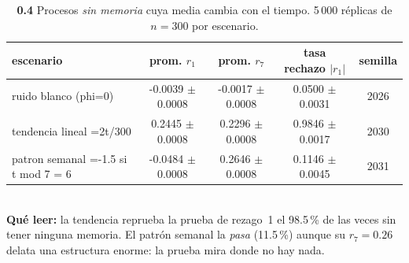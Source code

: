 \begin{table}[htbp]
\centering
\footnotesize
\caption{\textbf{0.4} Procesos \emph{sin memoria} cuya media cambia con el tiempo. 5\,000 r\'eplicas de $n=300$ por escenario.}
\label{tab:p0_tabla_media_no_constante}
\begin{tabular}{lcccc}
\toprule
\textbf{escenario} & \textbf{prom. $r_1$} & \textbf{prom. $r_7$} & \textbf{tasa rechazo $|r_1|$} & \textbf{semilla} \\
\midrule
ruido blanco (phi=0) & -0.0039 \tiny$\pm$0.0008 & -0.0017 \tiny$\pm$0.0008 & 0.0500 \tiny$\pm$0.0031 & 2026 \\
tendencia lineal =2t/300 & 0.2445 \tiny$\pm$0.0008 & 0.2296 \tiny$\pm$0.0008 & 0.9846 \tiny$\pm$0.0017 & 2030 \\
patron semanal =-1.5 si t mod 7 = 6 & -0.0484 \tiny$\pm$0.0008 & 0.2646 \tiny$\pm$0.0008 & 0.1146 \tiny$\pm$0.0045 & 2031 \\
\bottomrule
\end{tabular}
\\[0.3em]{\scriptsize \textbf{Qu\'e leer:} la tendencia reprueba la prueba de rezago~1 el 98.5\,\% de las veces sin tener ninguna memoria. El patr\'on semanal la \emph{pasa} (11.5\,\%) aunque su $r_7=0.26$ delata una estructura enorme: la prueba mira donde no hay nada.}
\end{table}
